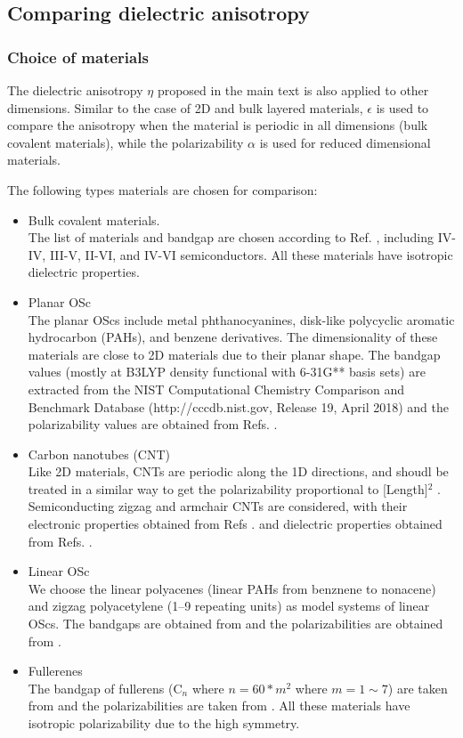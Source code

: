 \documentclass[manuscript=suppinfo,email=true,hyperref=true,keywords=false]{achemso}
\begin{document}
\subsection{Comparing dielectric anisotropy}
\label{ssec:aniso}
\subsubsection{Choice of materials}
\label{sssec:aniso-1}
The dielectric anisotropy $\eta$ proposed in the main text is also
applied to other dimensions. Similar to the case of 2D and bulk
layered materials, $\epsilon$ is used to compare the anisotropy when
the material is periodic in all dimensions (bulk covalent materials),
while the polarizability $\alpha$ is used for reduced dimensional
materials.

The following types materials are chosen for comparison:
\begin{itemize}
\item Bulk covalent materials.  \\
  The list of materials and bandgap are chosen according to
  Ref. , including IV-IV, III-V, II-VI, and
  IV-VI semiconductors. All these materials have isotropic dielectric
  properties.
\item Planar OSc \\
  The planar OScs include metal phthanocyanines, disk-like polycyclic
  aromatic hydrocarbon (PAHs), and benzene derivatives. The
  dimensionality of these materials are close to 2D materials due to
  their planar shape. The bandgap values (mostly at B3LYP density
  functional with 6-31G** basis sets) are extracted from the NIST
  Computational Chemistry Comparison and Benchmark Database
  (http://cccdb.nist.gov, Release 19, April 2018) and the
  polarizability values are obtained from
  Refs. .
\item Carbon nanotubes (CNT) \\
  Like 2D materials, CNTs are periodic along the 1D directions, and
  shoudl be treated in a similar way to get the polarizability
  proportional to [Length]$^{2}$ \cite{Benedict_1995}. Semiconducting
  zigzag and armchair CNTs are considered, with their electronic
  properties obtained from Refs
  . and dielectric properties
  obtained from
  Refs. .
\item Linear OSc \\
  We choose the linear polyacenes (linear PAHs from benznene to
  nonacene) and zigzag polyacetylene (1--9 repeating units) as model
  systems of linear OScs. The bandgaps are obtained from
   and the polarizabilities are obtained from
  .
\item Fullerenes \\
  The bandgap of fullerens (C$_{n}$ where $n=60*m^{2}$ where
  $m=1\sim{}7$) are taken from  and the
  polarizabilities are taken from . All these
  materials have isotropic polarizability due to the high symmetry.
\end{itemize}
\end{document}
